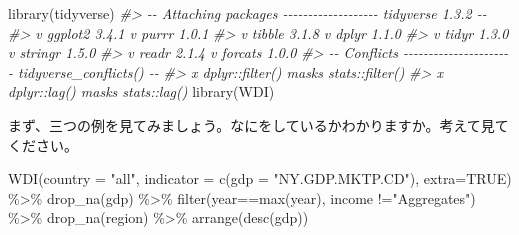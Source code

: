 \documentclass[
]{bxjsbook}
\newenvironment{Shaded}{\begin{snugshade}}{\end{snugshade}}
\newcommand{\AttributeTok}[1]{\textcolor[rgb]{0.77,0.63,0.00}{#1}}
\newcommand{\CommentTok}[1]{\textcolor[rgb]{0.56,0.35,0.01}{\textit{#1}}}
\newcommand{\ConstantTok}[1]{\textcolor[rgb]{0.00,0.00,0.00}{#1}}
\newcommand{\FunctionTok}[1]{\textcolor[rgb]{0.00,0.00,0.00}{#1}}
\newcommand{\NormalTok}[1]{#1}
\newcommand{\SpecialCharTok}[1]{\textcolor[rgb]{0.00,0.00,0.00}{#1}}
\newcommand{\StringTok}[1]{\textcolor[rgb]{0.31,0.60,0.02}{#1}}
\theoremstyle{definition}
\theoremstyle{definition}
\theoremstyle{definition}
\theoremstyle{definition}
\theoremstyle{remark}
\begin{document}
\begin{Shaded}
\begin{Highlighting}[]
\FunctionTok{library}\NormalTok{(tidyverse)}
\CommentTok{\#\textgreater{} {-}{-} Attaching packages {-}{-}{-}{-}{-}{-}{-}{-}{-}{-}{-}{-}{-}{-}{-}{-}{-}{-}{-} tidyverse 1.3.2 {-}{-}}
\CommentTok{\#\textgreater{} v ggplot2 3.4.1     v purrr   1.0.1}
\CommentTok{\#\textgreater{} v tibble  3.1.8     v dplyr   1.1.0}
\CommentTok{\#\textgreater{} v tidyr   1.3.0     v stringr 1.5.0}
\CommentTok{\#\textgreater{} v readr   2.1.4     v forcats 1.0.0}
\CommentTok{\#\textgreater{} {-}{-} Conflicts {-}{-}{-}{-}{-}{-}{-}{-}{-}{-}{-}{-}{-}{-}{-}{-}{-}{-}{-}{-}{-}{-} tidyverse\_conflicts() {-}{-}}
\CommentTok{\#\textgreater{} x dplyr::filter() masks stats::filter()}
\CommentTok{\#\textgreater{} x dplyr::lag()    masks stats::lag()}
\FunctionTok{library}\NormalTok{(WDI)}
\end{Highlighting}
\end{Shaded}

まず、三つの例を見てみましょう。なにをしているかわかりますか。考えて見てください。

\begin{Shaded}
\begin{Highlighting}[]
\FunctionTok{WDI}\NormalTok{(}\AttributeTok{country =} \StringTok{"all"}\NormalTok{, }\AttributeTok{indicator =} \FunctionTok{c}\NormalTok{(}\AttributeTok{gdp =} \StringTok{"NY.GDP.MKTP.CD"}\NormalTok{),}
    \AttributeTok{extra=}\ConstantTok{TRUE}\NormalTok{) }\SpecialCharTok{\%\textgreater{}\%} \FunctionTok{drop\_na}\NormalTok{(gdp) }\SpecialCharTok{\%\textgreater{}\%}
  \FunctionTok{filter}\NormalTok{(year}\SpecialCharTok{==}\FunctionTok{max}\NormalTok{(year), income }\SpecialCharTok{!=}\StringTok{"Aggregates"}\NormalTok{) }\SpecialCharTok{\%\textgreater{}\%} 
  \FunctionTok{drop\_na}\NormalTok{(region) }\SpecialCharTok{\%\textgreater{}\%} \FunctionTok{arrange}\NormalTok{(}\FunctionTok{desc}\NormalTok{(gdp))}
\end{Highlighting}
\end{Shaded}
\end{document}
